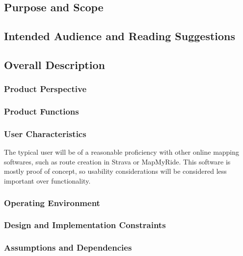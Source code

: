 \documentclass[11pt,twoside]{report}
\begin{document}
\subsection{Purpose and Scope}

\subsection{Intended Audience and Reading Suggestions}

\subsection{Overall Description}
\subsubsection{Product Perspective}

\subsubsection{Product Functions}

\subsubsection{User Characteristics}
The typical user will be of a reasonable proficiency with other online mapping softwares, such as route
creation in Strava or MapMyRide. This software is mostly proof of concept, so usability considerations will
be considered less important over functionality.

\subsubsection{Operating Environment}

\subsubsection{Design and Implementation Constraints}

\subsubsection{Assumptions and Dependencies}
\end{document}
